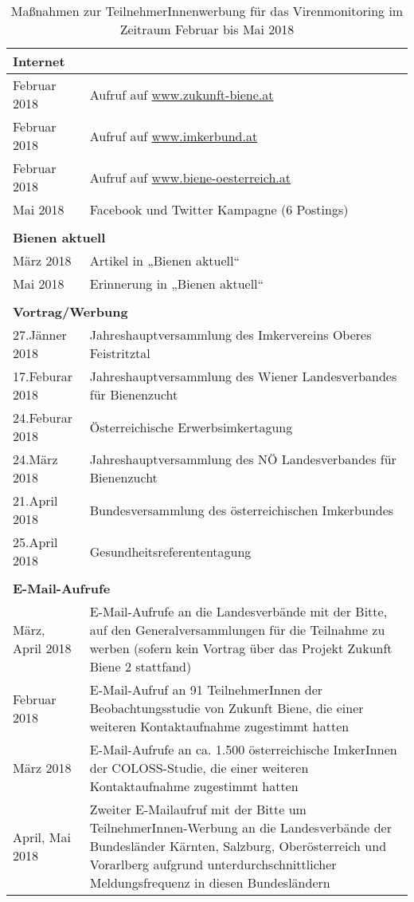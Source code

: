 
\begin{table}[htp]
    \caption{Maßnahmen zur TeilnehmerInnenwerbung für das Virenmonitoring im Zeitraum Februar bis Mai 2018}
    \centering
    \begin{tabular}{l|p{13cm}}
    \multicolumn{2}{l}{\textbf{Internet}} \\
    \midrule
    Februar 2018  & Aufruf auf \url{www.zukunft-biene.at} \\
    Februar 2018  & Aufruf auf \url{www.imkerbund.at} \\ 
    Februar 2018  & Aufruf auf \url{www.biene-oesterreich.at} \\ 
    Mai 2018      & Facebook und Twitter Kampagne (6 Postings) \\ 
    
    \multicolumn{2}{l}{\textbf{}} \\
    \multicolumn{2}{l}{\textbf{Bienen aktuell}} \\
    \midrule
    März 2018     & Artikel in „Bienen aktuell“ \\ 
    Mai 2018      & Erinnerung in „Bienen aktuell“ \\ 
    
    \multicolumn{2}{l}{\textbf{}} \\
    \multicolumn{2}{l}{\textbf{Vortrag/Werbung}} \\
    \midrule
    27.Jänner 2018    & Jahreshauptversammlung des Imkervereins Oberes Feistritztal \\
    17.Feburar 2018   & Jahreshauptversammlung des Wiener Landesverbandes für Bienenzucht \\ 
    24.Feburar 2018   & Österreichische Erwerbsimkertagung \\
    24.März 2018      & Jahreshauptversammlung des NÖ Landesverbandes für Bienenzucht \\
    21.April 2018     & Bundesversammlung des österreichischen Imkerbundes \\
    25.April 2018     & Gesundheitsreferententagung \\
    
    \multicolumn{2}{l}{\textbf{}} \\
    \multicolumn{2}{l}{\textbf{E-Mail-Aufrufe}} \\
    \midrule
    
    März, April 2018 & E-Mail-Aufrufe an die Landesverbände mit der Bitte, auf den Generalversammlungen für die Teilnahme zu werben (sofern kein Vortrag über das Projekt Zukunft Biene 2 stattfand) \\
    Februar 2018 & E-Mail-Aufruf an 91 TeilnehmerInnen der Beobachtungsstudie von Zukunft Biene, die einer weiteren Kontaktaufnahme zugestimmt hatten\\
    März 2018 & E-Mail-Aufrufe an ca. 1.500 österreichische ImkerInnen der COLOSS-Studie, die einer weiteren Kontaktaufnahme zugestimmt hatten\\
    April, Mai 2018 & Zweiter E-Mailaufruf mit der Bitte um TeilnehmerInnen-Werbung an die Landesverbände der Bundesländer Kärnten, Salzburg, Oberösterreich und Vorarlberg aufgrund unterdurchschnittlicher Meldungsfrequenz in diesen Bundesländern \\
    
    \end{tabular}
    \label{tab:a:werbung}
\end{table}
